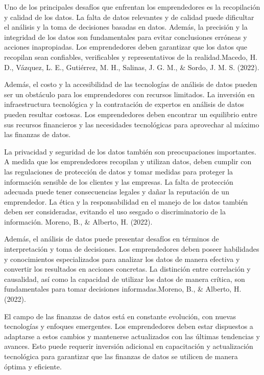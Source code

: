 \documentclass[
  letterpaper,
  DIV=11,
  numbers=noendperiod]{scrreprt}
\begin{document}
Uno de los principales desafíos que enfrentan los emprendedores es la
recopilación y calidad de los datos. La falta de datos relevantes y de
calidad puede dificultar el análisis y la toma de decisiones basadas en
datos. Además, la precisión y la integridad de los datos son
fundamentales para evitar conclusiones erróneas y acciones inapropiadas.
Los emprendedores deben garantizar que los datos que recopilan sean
confiables, verificables y representativos de la realidad.Macedo, H. D.,
Vázquez, L. E., Gutiérrez, M. H., Salinas, J. G. M., \& Sordo, J. M. S.
(2022).

Además, el costo y la accesibilidad de las tecnologías de análisis de
datos pueden ser un obstáculo para los emprendedores con recursos
limitados. La inversión en infraestructura tecnológica y la contratación
de expertos en análisis de datos pueden resultar costosas. Los
emprendedores deben encontrar un equilibrio entre sus recursos
financieros y las necesidades tecnológicas para aprovechar al máximo las
finanzas de datos.

La privacidad y seguridad de los datos también son preocupaciones
importantes. A medida que los emprendedores recopilan y utilizan datos,
deben cumplir con las regulaciones de protección de datos y tomar
medidas para proteger la información sensible de los clientes y las
empresas. La falta de protección adecuada puede tener consecuencias
legales y dañar la reputación de un emprendedor. La ética y la
responsabilidad en el manejo de los datos también deben ser
consideradas, evitando el uso sesgado o discriminatorio de la
información. Moreno, B., \& Alberto, H. (2022).

Además, el análisis de datos puede presentar desafíos en términos de
interpretación y toma de decisiones. Los emprendedores deben poseer
habilidades y conocimientos especializados para analizar los datos de
manera efectiva y convertir los resultados en acciones concretas. La
distinción entre correlación y causalidad, así como la capacidad de
utilizar los datos de manera crítica, son fundamentales para tomar
decisiones informadas.Moreno, B., \& Alberto, H. (2022).

El campo de las finanzas de datos está en constante evolución, con
nuevas tecnologías y enfoques emergentes. Los emprendedores deben estar
dispuestos a adaptarse a estos cambios y mantenerse actualizados con las
últimas tendencias y avances. Esto puede requerir inversión adicional en
capacitación y actualización tecnológica para garantizar que las
finanzas de datos se utilicen de manera óptima y eficiente.
\end{document}
